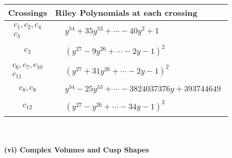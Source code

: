 \documentclass[1p]{elsarticle_modified}
\theoremstyle{definition}
\begin{document}
\begin{tabular}{m{50pt}|m{274pt}}
Crossings & \hspace{64pt}Riley Polynomials at each crossing \\
\hline $$\begin{aligned}c_{1},c_{2},c_{4}\\c_{5}\end{aligned}$$&$\begin{aligned}
&y^{54}+35 y^{53}+\cdots-40 y^2+1
\end{aligned}$\\
\hline $$\begin{aligned}c_{3}\end{aligned}$$&$\begin{aligned}
&(y^{27}-9 y^{26}+\cdots-2 y-1)^{2}
\end{aligned}$\\
\hline $$\begin{aligned}c_{6},c_{7},c_{10}\\c_{11}\end{aligned}$$&$\begin{aligned}
&(y^{27}+31 y^{26}+\cdots-2 y-1)^{2}
\end{aligned}$\\
\hline $$\begin{aligned}c_{8},c_{9}\end{aligned}$$&$\begin{aligned}
&y^{54}-25 y^{53}+\cdots-3824037376 y+393744649
\end{aligned}$\\
\hline $$\begin{aligned}c_{12}\end{aligned}$$&$\begin{aligned}
&(y^{27}- y^{26}+\cdots-34 y-1)^{2}
\end{aligned}$\\
\hline
\end{tabular}\\~\\
\newpage\flushleft \textbf{(vi) Complex Volumes and Cusp Shapes}
\end{document}
